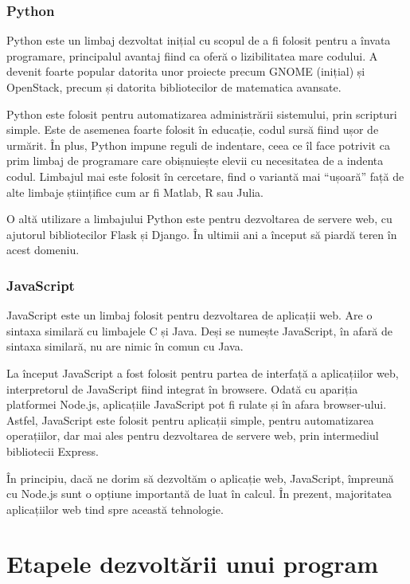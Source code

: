\subsubsection{Python}
\label{sec:appdev-langs-hybrid-ex-python}

Python este un limbaj dezvoltat inițial cu scopul de a fi folosit pentru a
învata programare, principalul avantaj fiind ca oferă o lizibilitatea mare
codului. A devenit foarte popular datorita unor proiecte precum GNOME (inițial)
și OpenStack, precum și datorita bibliotecilor de matematica avansate.

Python este folosit pentru automatizarea administrării sistemului, prin
scripturi simple. Este de asemenea foarte folosit în educație, codul sursă fiind
ușor de urmărit. În plus, Python impune reguli de indentare, ceea ce îl face
potrivit ca prim limbaj de programare care obișnuiește elevii cu necesitatea de
a indenta codul. Limbajul mai este folosit în cercetare, find o variantă mai
“ușoară” față de alte limbaje științifice cum ar fi Matlab, R sau Julia.

O altă utilizare a limbajului Python este pentru dezvoltarea de servere web, cu
ajutorul bibliotecilor Flask și Django. În ultimii ani a început să piardă teren
în acest domeniu.

\subsubsection{JavaScript}
\label{sec:appdev-langs-hybrid-ex-js}

JavaScript este un limbaj folosit pentru dezvoltarea de aplicații web. Are o
sintaxa similară cu limbajele C și Java. Deși se numește JavaScript, în afară de
sintaxa similară, nu are nimic în comun cu Java.

La început JavaScript a fost folosit pentru partea de interfață a aplicațiilor
web, interpretorul de JavaScript fiind integrat în browsere. Odată cu apariția
platformei Node.js, aplicațiile JavaScript pot fi rulate și în afara
browser-ului. Astfel, JavaScript este folosit pentru aplicații simple, pentru
automatizarea operațiilor, dar mai ales pentru dezvoltarea de servere web, prin
intermediul bibliotecii Express.

În principiu, dacă ne dorim să dezvoltăm o aplicație web, JavaScript, împreună
cu Node.js sunt o opțiune importantă de luat în calcul. În prezent, majoritatea
aplicațiilor web tind spre această tehnologie.

\section{Etapele dezvoltării unui program}
\label{sec:appdev-steps}

